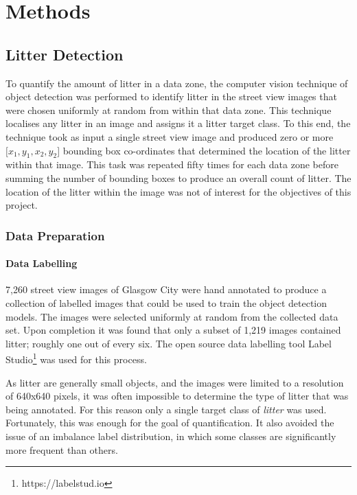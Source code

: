 \documentclass{thesis}
\begin{document}

\chapter{Methods} \label{chapter:methods}

\section{Litter Detection}

To quantify the amount of litter in a data zone, the computer vision technique of object detection was performed to identify litter in the street view images that were chosen uniformly at random from within that data zone. This technique localises any litter in an image and assigns it a litter target class. To this end, the technique took as input a single street view image and produced zero or more $[x_1,y_1,x_2,y_2$] bounding box co-ordinates that determined the location of the litter within that image. This task was repeated fifty times for each data zone before summing the number of bounding boxes to produce an overall count of litter. The location of the litter within the image was not of interest for the objectives of this project.

\subsection{Data Preparation}

\subsubsection{Data Labelling}

7,260 street view images of Glasgow City were hand annotated to produce a collection of labelled images that could be used to train the object detection models. The images were selected uniformly at random from the collected data set. Upon completion it was found that only a subset of 1,219 images contained litter; roughly one out of every six. The open source data labelling tool Label Studio\footnote{https://labelstud.io} was used for this process.

As litter are generally small objects, and the images were limited to a resolution of 640x640 pixels, it was often impossible to determine the type of litter that was being annotated. For this reason only a single target class of \textit{litter} was used. Fortunately, this was enough for the goal of quantification. It also avoided the issue of an imbalance label distribution, in which some classes are significantly more frequent than others.
\end{document}
